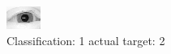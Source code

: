 \begin{figure}[h!]
\begin{center}
\includegraphics[width=0.60\columnwidth]{figures/ID3078_class_1_target_2.png}
\end{center}
\caption{ Classification: 1 actual target: 2}
\label{fig:ID3078_class_1_target_2}
\end{figure}

